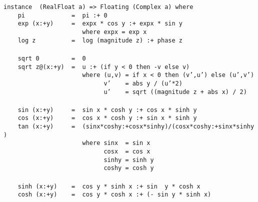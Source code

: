 \eprogB\noindent\bprogB
\mbox{\tt instance\ \ (RealFloat\ a)\ =>\ Floating\ (Complex\ a)\ where}\\
\mbox{\tt \ \ \ \ pi\ \ \ \ \ \ \ \ \ \ \ \ \ =\ \ pi\ :+\ 0}\\
\mbox{\tt \ \ \ \ exp\ (x:+y)\ \ \ \ \ =\ \ expx\ *\ cos\ y\ :+\ expx\ *\ sin\ y}\\
\mbox{\tt \ \ \ \ \ \ \ \ \ \ \ \ \ \ \ \ \ \ \ \ \ \ where\ expx\ =\ exp\ x}\\
\mbox{\tt \ \ \ \ log\ z\ \ \ \ \ \ \ \ \ \ =\ \ log\ (magnitude\ z)\ :+\ phase\ z}\\
\mbox{\tt }\\[-8pt]
\mbox{\tt \ \ \ \ sqrt\ 0\ \ \ \ \ \ \ \ \ =\ \ 0}\\
\mbox{\tt \ \ \ \ sqrt\ z@(x:+y)\ \ =\ \ u\ :+\ (if\ y\ <\ 0\ then\ -v\ else\ v)}\\
\mbox{\tt \ \ \ \ \ \ \ \ \ \ \ \ \ \ \ \ \ \ \ \ \ \ where\ (u,v)\ =\ if\ x\ <\ 0\ then\ (v',u')\ else\ (u',v')}\\
\mbox{\tt \ \ \ \ \ \ \ \ \ \ \ \ \ \ \ \ \ \ \ \ \ \ \ \ \ \ \ \ v'\ \ \ \ =\ abs\ y\ /\ (u'*2)}\\
\mbox{\tt \ \ \ \ \ \ \ \ \ \ \ \ \ \ \ \ \ \ \ \ \ \ \ \ \ \ \ \ u'\ \ \ \ =\ sqrt\ ((magnitude\ z\ +\ abs\ x)\ /\ 2)}\\
\mbox{\tt }\\[-8pt]
\mbox{\tt \ \ \ \ sin\ (x:+y)\ \ \ \ \ =\ \ sin\ x\ *\ cosh\ y\ :+\ cos\ x\ *\ sinh\ y}\\
\mbox{\tt \ \ \ \ cos\ (x:+y)\ \ \ \ \ =\ \ cos\ x\ *\ cosh\ y\ :+\ sin\ x\ *\ sinh\ y}\\
\mbox{\tt \ \ \ \ tan\ (x:+y)\ \ \ \ \ =\ \ (sinx*coshy:+cosx*sinhy)/(cosx*coshy:+sinx*sinhy)}\\
\mbox{\tt \ \ \ \ \ \ \ \ \ \ \ \ \ \ \ \ \ \ \ \ \ \ where\ sinx\ \ =\ sin\ x}\\
\mbox{\tt \ \ \ \ \ \ \ \ \ \ \ \ \ \ \ \ \ \ \ \ \ \ \ \ \ \ \ \ cosx\ \ =\ cos\ x}\\
\mbox{\tt \ \ \ \ \ \ \ \ \ \ \ \ \ \ \ \ \ \ \ \ \ \ \ \ \ \ \ \ sinhy\ =\ sinh\ y}\\
\mbox{\tt \ \ \ \ \ \ \ \ \ \ \ \ \ \ \ \ \ \ \ \ \ \ \ \ \ \ \ \ coshy\ =\ cosh\ y}\\
\mbox{\tt }\\[-8pt]
\mbox{\tt \ \ \ \ sinh\ (x:+y)\ \ \ \ =\ \ cos\ y\ *\ sinh\ x\ :+\ sin\ \ y\ *\ cosh\ x}\\
\mbox{\tt \ \ \ \ cosh\ (x:+y)\ \ \ \ =\ \ cos\ y\ *\ cosh\ x\ :+\ (-\ sin\ y\ *\ sinh\ x)}\\
